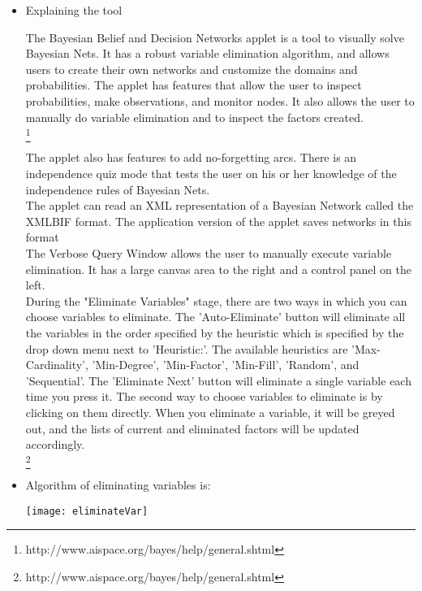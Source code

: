\begin{itemize}
\item{Explaining the tool}

\tab The Bayesian Belief and Decision Networks applet is a tool to visually solve Bayesian Nets. It has a robust variable elimination algorithm, and allows users to create their own networks and customize the domains and probabilities. The applet has features that allow the user to inspect probabilities, make observations, and monitor nodes. It also allows the user to manually do variable elimination and to inspect the factors created.\\ \footnote{http://www.aispace.org/bayes/help/general.shtml}

\tab The applet also has features to add no-forgetting arcs. There is an independence quiz mode that tests the user on his or her knowledge of the independence rules of Bayesian Nets.\\


\tab The applet can read an XML representation of a Bayesian Network called the XMLBIF format. The application version of the applet saves networks in this format\\

\tab The Verbose Query Window allows the user to manually execute variable elimination. It has a large canvas area to the right and a control panel on the left.\\

\tab During the "Eliminate Variables" stage, there are two ways in which you can choose variables to eliminate. The 'Auto-Eliminate' button will eliminate all the variables in the order specified by the heuristic which is specified by the drop down menu next to 'Heuristic:'. The available heuristics are 'Max-Cardinality', 'Min-Degree', 'Min-Factor', 'Min-Fill', 'Random', and 'Sequential'. The 'Eliminate Next' button will eliminate a single variable each time you press it. The second way to choose variables to eliminate is by clicking on them directly. When you eliminate a variable, it will be greyed out, and the lists of current and eliminated factors will be updated accordingly. \\\footnote{http://www.aispace.org/bayes/help/general.shtml}


\item Algorithm of eliminating variables is:\\

\begin{center}
  	\texttt{[image: eliminateVar]}
\end{center}

\end{itemize}
